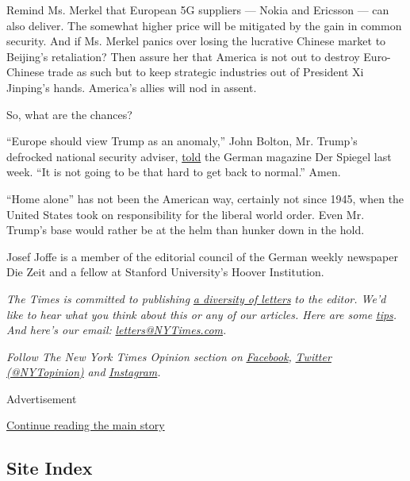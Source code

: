 Remind Ms. Merkel that European 5G suppliers --- Nokia and Ericsson ---
can also deliver. The somewhat higher price will be mitigated by the
gain in common security. And if Ms. Merkel panics over losing the
lucrative Chinese market to Beijing's retaliation? Then assure her that
America is not out to destroy Euro-Chinese trade as such but to keep
strategic industries out of President Xi Jinping's hands. America's
allies will nod in assent.

So, what are the chances?

``Europe should view Trump as an anomaly,'' John Bolton, Mr. Trump's
defrocked national security adviser,
\href{https://www.spiegel.de/international/world/interview-with-john-bolton-trump-is-capable-of-almost-anything-a-90c5452e-53f3-4e72-a788-fd7ac74317a1}{told}
the German magazine Der Spiegel last week. ``It is not going to be that
hard to get back to normal.'' Amen.

``Home alone'' has not been the American way, certainly not since 1945,
when the United States took on responsibility for the liberal world
order. Even Mr. Trump's base would rather be at the helm than hunker
down in the hold.

Josef Joffe is a member of the editorial council of the German weekly
newspaper Die Zeit and a fellow at Stanford University's Hoover
Institution.

\emph{The Times is committed to publishing}
\href{https://www.nytimes3xbfgragh.onion/2019/01/31/opinion/letters/letters-to-editor-new-york-times-women.html}{\emph{a
diversity of letters}} \emph{to the editor. We'd like to hear what you
think about this or any of our articles. Here are some}
\href{https://help.nytimes3xbfgragh.onion/hc/en-us/articles/115014925288-How-to-submit-a-letter-to-the-editor}{\emph{tips}}\emph{.
And here's our email:}
\href{mailto:letters@NYTimes.com}{\emph{letters@NYTimes.com}}\emph{.}

\emph{Follow The New York Times Opinion section on}
\href{https://www.facebookcorewwwi.onion/nytopinion}{\emph{Facebook}}\emph{,}
\href{http://twitter.com/NYTOpinion}{\emph{Twitter (@NYTopinion)}}
\emph{and}
\href{https://www.instagram.com/nytopinion/}{\emph{Instagram}}\emph{.}

Advertisement

\protect\hyperlink{after-bottom}{Continue reading the main story}

\hypertarget{site-index}{%
\subsection{Site Index}\label{site-index}}

